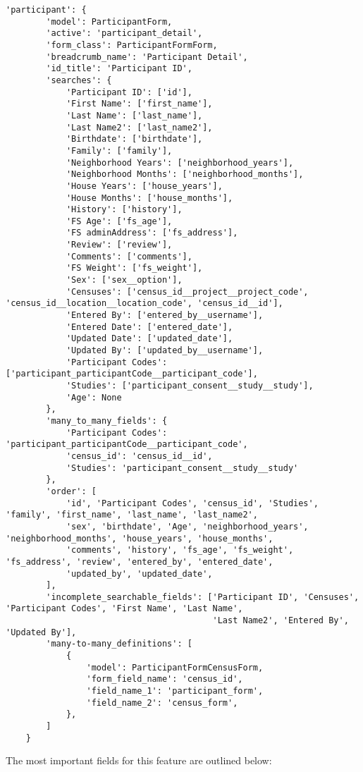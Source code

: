 \documentclass{article}
\begin{document}
\begin{verbatim}
'participant': {
        'model': ParticipantForm,
        'active': 'participant_detail',
        'form_class': ParticipantFormForm,
        'breadcrumb_name': 'Participant Detail',
        'id_title': 'Participant ID',
        'searches': {
            'Participant ID': ['id'],
            'First Name': ['first_name'],
            'Last Name': ['last_name'],
            'Last Name2': ['last_name2'],
            'Birthdate': ['birthdate'],
            'Family': ['family'],
            'Neighborhood Years': ['neighborhood_years'],
            'Neighborhood Months': ['neighborhood_months'],
            'House Years': ['house_years'],
            'House Months': ['house_months'],
            'History': ['history'],
            'FS Age': ['fs_age'],
            'FS adminAddress': ['fs_address'],
            'Review': ['review'],
            'Comments': ['comments'],
            'FS Weight': ['fs_weight'],
            'Sex': ['sex__option'],
            'Censuses': ['census_id__project__project_code', 'census_id__location__location_code', 'census_id__id'],
            'Entered By': ['entered_by__username'],
            'Entered Date': ['entered_date'],
            'Updated Date': ['updated_date'],
            'Updated By': ['updated_by__username'],
            'Participant Codes': ['participant_participantCode__participant_code'],
            'Studies': ['participant_consent__study__study'],
            'Age': None
        },
        'many_to_many_fields': {
            'Participant Codes': 'participant_participantCode__participant_code',
            'census_id': 'census_id__id',
            'Studies': 'participant_consent__study__study'
        },
        'order': [
            'id', 'Participant Codes', 'census_id', 'Studies', 'family', 'first_name', 'last_name', 'last_name2',
            'sex', 'birthdate', 'Age', 'neighborhood_years', 'neighborhood_months', 'house_years', 'house_months',
            'comments', 'history', 'fs_age', 'fs_weight', 'fs_address', 'review', 'entered_by', 'entered_date',
            'updated_by', 'updated_date',
        ],
        'incomplete_searchable_fields': ['Participant ID', 'Censuses', 'Participant Codes', 'First Name', 'Last Name',
                                         'Last Name2', 'Entered By', 'Updated By'],
        'many-to-many_definitions': [
            {
                'model': ParticipantFormCensusForm,
                'form_field_name': 'census_id',
                'field_name_1': 'participant_form',
                'field_name_2': 'census_form',
            },
        ]
    }
\end{verbatim}
The most important fields for this feature are outlined below:
\end{document}
